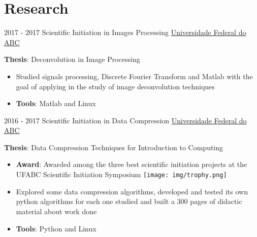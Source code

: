 \documentclass[letterpaper]{twentysecondcv} %
\begin{document}
\section{Research}
\begin{twenty}
	\twentyitem
    	{2017 -}
		{2017}
        {Scientific Initiation in Images Processing}
        {\href{http://prograd.ufabc.edu.br/}{Universidade Federal do ABC}}
        {}
        {
       	\textbf{Thesis}: Deconvolution in Image Processing\\
        {\begin{itemize}
        \item Studied signals processing, Discrete Fourier Transform and Matlab with the goal of applying in the study of image deconvolution techniques
        \item \textbf{Tools}: Matlab and Linux\\ \vspace{2mm}
		\end{itemize}}
        }

	\twentyitem
    	{2016 -}
		{2017}
        {Scientific Initiation in Data Compression}
        {\href{http://prograd.ufabc.edu.br/}{Universidade Federal do ABC}}
        {}
        {
       	\textbf{Thesis}: Data Compression Techniques for Introduction to Computing \\
        {\begin{itemize}
        \item \textbf{Award}: Awarded among the three best scientific initiation projects at the UFABC Scientific Initiation Symposium  {\texttt{[image: img/trophy.png]}} \\
        \item Explored some data compression algorithms, developed and tested its own python algorithms for each one studied and built a 300 pages of didactic material about work done 
        \item \textbf{Tools}: Python and Linux \vspace{2mm}
		\end{itemize}}
        }
\end{twenty}

\end{document}
